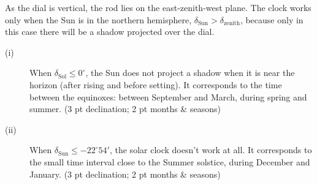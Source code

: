 As the dial is vertical, the rod lies on the east-zenith-west plane. The
clock works only when the Sun is in the northern hemisphere,
$\delta_{\mathrm{Sun}} > \delta_{\mathrm{zenith}}$, because only in this case
there will be a shadow projected over the dial.


\begin{description}
\item[(i)] When $\delta_{\mathrm{Sol}} \le 0^\circ$, the Sun does not project
  a shadow when it is near the horizon (after rising and before setting). It
  corresponds to the time between the equinoxes: between September and March,
  during spring and summer.
  \hfill(3 pt declination; 2 pt months \& seasons)
\item[(ii)] When $\delta_{\mathrm{Sun}} \le -22^\circ 54'$, the solar clock
  doesn't work at all. It corresponds to the small time interval close to the
  Summer solstice, during December and January.
  \hfill(3 pt declination; 2 pt months \& seasons)
\end{description}
